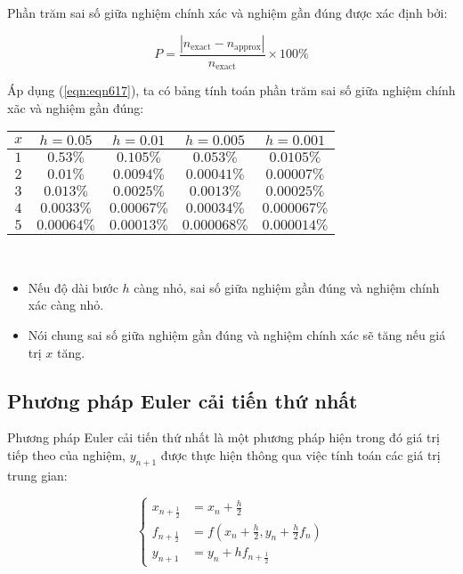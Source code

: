 Phần trăm sai số giữa nghiệm chính xác và nghiệm gần đúng được xác định bởi:\par
\begin{equation}\label{eqn:eqn617}
	P=\frac{|n_\text{exact}-n_\text{approx}|}{n_\text{exact}}\times 100\%
\end{equation}

Áp dụng (\ref{eqn:eqn617}), ta có bảng tính toán phần trăm sai số giữa nghiệm chính xãc và nghiệm gần đúng:
\begin{longtable}{|c|c|c|c|c|}\hline
	$x$ & $h=0.05$    & $h=0.01$    & $h=0.005$    & $h=0.001$    \\\hline
	\endhead
	$1$ & $0.53\%$    & $0.105\%$   & $0.053\%$    & $0.0105\%$   \\\hline
	$2$ & $0.01\%$    & $0.0094\%$  & $0.00041\%$  & $0.00007\%$  \\\hline
	$3$ & $0.013\%$   & $0.0025\%$  & $0.0013\%$   & $0.00025\%$  \\\hline
	$4$ & $0.0033\%$  & $0.00067\%$ & $0.00034\%$  & $0.000067\%$ \\\hline
	$5$ & $0.00064\%$ & $0.00013\%$ & $0.000068\%$ & $0.000014\%$ \\\hline
\end{longtable}

\begin{remark}~\begin{itemize}
	\item Nếu độ dài bước $h$ càng nhỏ, sai số giữa nghiệm gần đúng và nghiệm chính xác càng nhỏ.
	\item Nói chung sai số giữa nghiệm gần đúng và nghiệm chính xác sẽ tăng nếu giá trị $x$ tăng.
\end{itemize}\end{remark}

\subsection{Phương pháp Euler cải tiến thứ nhất}

Phương pháp Euler cải tiến thứ nhất là một phương pháp hiện trong đó giá trị tiếp theo của nghiệm, $y_{n+1}$ được thực hiện thông qua việc tính toán các giá trị trung gian:\par
\begin{equation}\label{eqn:eqn618}\begin{cases}
	x_{n+\frac12}&=x_n+\frac h2\\
	f_{n+\frac12}&=f\left(x_n+\frac h2, y_n+\frac h2f_n\right)\\
	y_{n+1}&=y_n+hf_{n+\frac12}
\end{cases}\end{equation}

